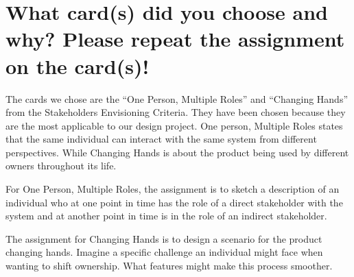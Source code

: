 \section{What card(s) did you choose and why? Please repeat the assignment on the card(s)!}

The cards we chose are the ``One Person, Multiple Roles'' and ``Changing Hands'' from the Stakeholders Envisioning Criteria. They have been chosen because they are the most applicable to our design project. One person, Multiple Roles states that the same individual can interact with the same system from different perspectives. While Changing Hands is about the product being used by different owners throughout its life. 

For One Person, Multiple Roles, the assignment is to sketch a description of an individual who at one point in time has the role of a direct stakeholder with the system and at another point in time is in the role of an indirect stakeholder. 

The assignment for Changing Hands is to design a scenario for the product changing hands. Imagine a specific challenge an individual might face when wanting to shift ownership. What features might make this process smoother. 
